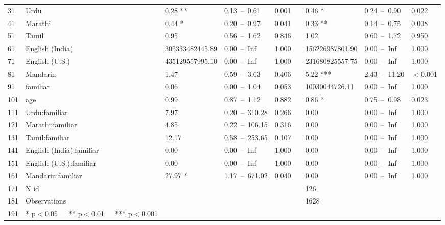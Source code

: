 \begin{table}[ht]
\begin{tabular}{}
  31 & Urdu & 0.28 ** & 0.13 – 0.61 & 0.001 &  & 0.46 * & 0.24 – 0.90 & 0.022 \\ 
  41 & Marathi & 0.44 * & 0.20 – 0.97 & 0.041 &  & 0.33 ** & 0.14 – 0.75 & 0.008 \\ 
  51 & Tamil & 0.95 & 0.56 – 1.62 & 0.846 &  & 1.02 & 0.60 – 1.72 & 0.950 \\ 
  61 & English (India) & 305333482445.89 & 0.00 – Inf & 1.000 &  & 156226987801.90 & 0.00 – Inf & 1.000 \\ 
  71 & English (U.S.) & 435129557995.10 & 0.00 – Inf & 1.000 &  & 231680825557.75 & 0.00 – Inf & 1.000 \\ 
  81 & Mandarin & 1.47 & 0.59 – 3.63 & 0.406 &  & 5.22 *** & 2.43 – 11.20 & $<$0.001 \\ 
  91 & familiar & 0.06 & 0.00 – 1.04 & 0.053 &  & 10030044726.11 & 0.00 – Inf & 1.000 \\ 
  101 & age & 0.99 & 0.87 – 1.12 & 0.882 &  & 0.86 * & 0.75 – 0.98 & 0.023 \\ 
  111 & Urdu:familiar & 7.97 & 0.20 – 310.28 & 0.266 &  & 0.00 & 0.00 – Inf & 1.000 \\ 
  121 & Marathi:familiar & 4.85 & 0.22 – 106.15 & 0.316 &  & 0.00 & 0.00 – Inf & 1.000 \\ 
  131 & Tamil:familiar & 12.17 & 0.58 – 253.65 & 0.107 &  & 0.00 & 0.00 – Inf & 1.000 \\ 
  141 & English (India):familiar & 0.00 & 0.00 – Inf & 1.000 &  & 0.00 & 0.00 – Inf & 1.000 \\ 
  151 & English (U.S.):familiar & 0.00 & 0.00 – Inf & 1.000 &  & 0.00 & 0.00 – Inf & 1.000 \\ 
  161 & Mandarin:familiar & 27.97 * & 1.17 – 671.02 & 0.040 &  & 0.00 & 0.00 – Inf & 1.000 \\ 
  171 & N id &  &  &  &  & 126 &  &  \\ 
  181 & Observations &  &  &  &  & 1628 &  &  \\ 
  191 & * p$<$0.05   ** p$<$0.01   *** p$<$0.001 &  &  &  &  &  &  &  \\ 
   \hline
\end{tabular}
\end{table}
